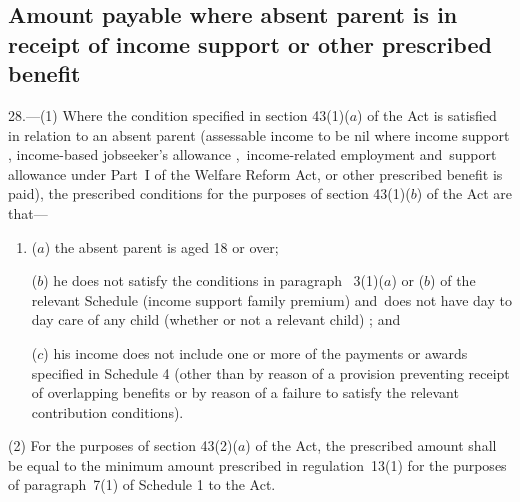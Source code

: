 \documentclass[12pt,a4paper]{article}
\begin{document}

\subsection[28. Amount payable where absent parent is in receipt of income support or other prescribed benefit]{Amount payable where absent parent is in receipt of income support or other prescribed benefit}

28.—(1) Where the condition specified in section 43(1)($a$) of the Act is satisfied in relation to an absent parent (assessable income to be nil where income support%
, income-based jobseeker’s allowance%
,~income-related employment and~support allowance under Part~I of the Welfare Reform Act,  %
or other prescribed benefit is paid), the prescribed conditions for the purposes of section 43(1)($b$) of the Act are that—
\begin{enumerate}\item[]
($a$) the absent parent is aged 18 or over;

($b$) he does not satisfy the conditions in paragraph~
3(1)($a$) or ($b$)  %
of the relevant Schedule (income support family premium)
and~does not have day to day care of any child (whether or not a relevant child)%
; and

($c$) 
his income does not include %
one or more of the payments or awards specified in Schedule 4 (other than by reason of a provision preventing receipt of overlapping benefits or by reason of a failure to satisfy the relevant contribution conditions).
\end{enumerate}

(2) For the purposes of section 43(2)($a$) of the Act, the prescribed amount shall be equal to the minimum amount prescribed in regulation~13(1) for the purposes of paragraph~7(1) of Schedule 1 to the Act.
\end{document}
